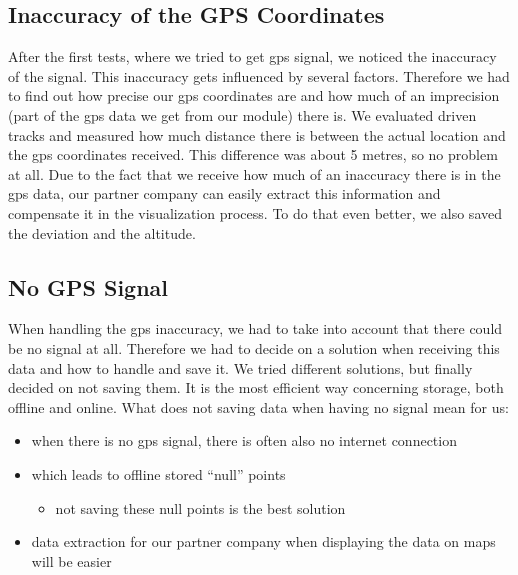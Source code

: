 \subsection{Inaccuracy of the GPS Coordinates}
After the first tests, where we tried to get \gls{gps} signal, we noticed the inaccuracy of the signal. This inaccuracy gets influenced by several factors. Therefore we had to find out how precise our \gls{gps} coordinates are and how much of an imprecision (part of the \gls{gps} data we get from our module) there is. 
\newline \newline
We evaluated driven tracks and measured how much distance there is between the actual location and the \gls{gps} coordinates received. This difference was about 5 metres, so no problem at all. 
\newline \newline
Due to the fact that we receive how much of an inaccuracy there is in the \gls{gps} data, our partner company can easily extract this information and compensate it in the visualization process. To do that even better, we also saved the deviation and the altitude.

\begin{center}
\end{center}

\subsection{No GPS Signal}
When handling the \gls{gps} inaccuracy, we had to take into account that there could be no signal at all. Therefore we had to decide on a solution when receiving this data and how to handle and save it.
\newline \newline
We tried different solutions, but finally decided on not saving them. It is the most efficient way concerning storage, both offline and online.
\newline \newline
What does not saving data when having no signal mean for us:
\begin{itemize}
\item when there is no \gls{gps} signal, there is often also no internet connection
\item which leads to offline stored “null” points
	\begin{itemize}
	\item not saving these null points is the best solution
	\end{itemize}		
\item data extraction for our partner company when displaying the data on maps will be easier
\end{itemize}
